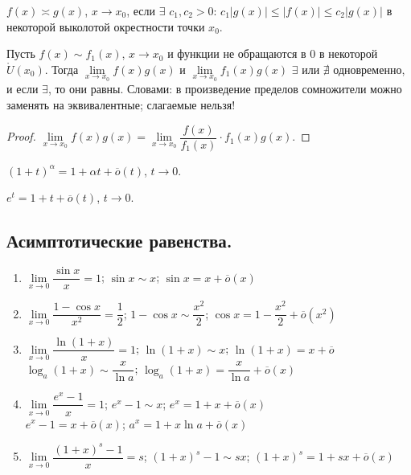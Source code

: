 \documentclass[12pt]{article}
\begin{document}
	\begin{definition}
		$f(x) \asymp g(x)$, $x \rightarrow x_0$, если $\exists$ $c_1, c_2 > 0$: $c_1|g(x)| \leqslant |f(x)| \leqslant c_2|g(x)|$ в некоторой выколотой окрестности точки $x_0$.
	\end{definition}
	\begin{theorem}
		Пусть $f(x) \sim f_1(x)$, $x \rightarrow x_0$ и функции не обращаются в $0$ в некоторой $\mathring{U}(x_0)$. Тогда $\lim\limits_{x \rightarrow x_0} f(x)g(x)$ и $\lim\limits_{x \rightarrow x_0} f_1(x)g(x)$ $\exists$ или $\nexists$ одновременно, и если $\exists$, то они равны. Словами: в произведение пределов сомножители можно заменять на эквивалентные; слагаемые нельзя!
	\end{theorem}
	\begin{proof}
		$\lim\limits_{x \rightarrow x_0} f(x)g(x) = \lim\limits_{x \rightarrow x_0} \dfrac{f(x)}{f_1(x)} \cdot f_1(x)g(x)$.
	\end{proof}
	\begin{statement}
		$(1 + t)^\alpha = 1 + \alpha t + \overline{o}(t)$, $t \rightarrow 0$.
	\end{statement}
	\begin{statement}
		$e^t = 1 + t + \overline{o}(t)$, $t \rightarrow 0$.
	\end{statement}
	\subsection{Асимптотические равенства.}
	\begin{enumerate}
		\item $\lim\limits_{x \rightarrow 0} \dfrac{\sin x}{x} = 1$; $\sin x \sim x$; $\sin x = x + \overline{o}(x)$
		\item $\lim\limits_{x \rightarrow 0} \dfrac{1 - \cos x}{x^2} = \dfrac{1}{2}$; $1 - \cos x \sim \dfrac{x^2}{2}$; $\cos x = 1 - \dfrac{x^2}{2} + \overline{o}(x^2)$
		\item $\lim\limits_{x \rightarrow 0} \dfrac{\ln (1 + x)}{x} = 1$; $\ln (1 + x) \sim x$; $\ln (1 + x) = x + \overline{o}$ \\
		$\log_a(1 + x) \sim \dfrac{x}{\ln a}$; $\log_a(1 + x) = \dfrac{x}{\ln a} + \overline{o}(x)$
		\item $\lim\limits_{x \rightarrow 0} \dfrac{e^x - 1}{x} = 1$; $e^x - 1 \sim x$; $e^x = 1 + x + \overline{o}(x)$ \\
		$e^x - 1 = x + \overline{o}(x)$; $a^x = 1 + x \ln a + \overline{o}(x)$
		\item $\lim\limits_{x \rightarrow 0} \dfrac{(1 + x)^s - 1}{x} = s$; $(1 + x)^s - 1 \sim sx$; $(1 + x)^s = 1 + sx + \overline{o}(x)$
	\end{enumerate}
\end{document}
